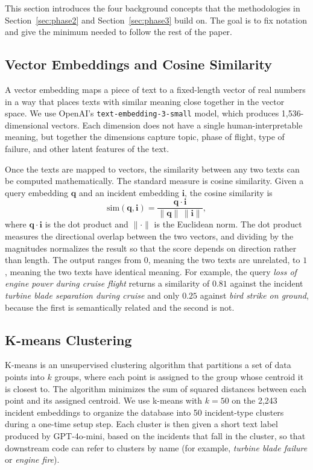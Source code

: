 \documentclass[11pt]{article}
\begin{document}
This section introduces the four background concepts that the methodologies in Section~\ref{sec:phase2} and Section~\ref{sec:phase3} build on. The goal is to fix notation and give the minimum needed to follow the rest of the paper.

\subsection{Vector Embeddings and Cosine Similarity}
\label{sec:background:embeddings}

A vector embedding maps a piece of text to a fixed-length vector of real numbers in a way that places texts with similar meaning close together in the vector space. We use OpenAI's \texttt{text-embedding-3-small} model, which produces 1{,}536-dimensional vectors. Each dimension does not have a single human-interpretable meaning, but together the dimensions capture topic, phase of flight, type of failure, and other latent features of the text.

Once the texts are mapped to vectors, the similarity between any two texts can be computed mathematically. The standard measure is cosine similarity. Given a query embedding $\mathbf{q}$ and an incident embedding $\mathbf{i}$, the cosine similarity is
\begin{equation}
\text{sim}(\mathbf{q}, \mathbf{i}) = \frac{\mathbf{q} \cdot \mathbf{i}}{\|\mathbf{q}\| \, \|\mathbf{i}\|},
\label{eq:cosine}
\end{equation}
where $\mathbf{q} \cdot \mathbf{i}$ is the dot product and $\|\cdot\|$ is the Euclidean norm. The dot product measures the directional overlap between the two vectors, and dividing by the magnitudes normalizes the result so that the score depends on direction rather than length. The output ranges from $0$, meaning the two texts are unrelated, to $1$, meaning the two texts have identical meaning. For example, the query \emph{loss of engine power during cruise flight} returns a similarity of $0.81$ against the incident \emph{turbine blade separation during cruise} and only $0.25$ against \emph{bird strike on ground}, because the first is semantically related and the second is not.

\subsection{K-means Clustering}
\label{sec:background:kmeans}

K-means is an unsupervised clustering algorithm that partitions a set of data points into $k$ groups, where each point is assigned to the group whose centroid it is closest to. The algorithm minimizes the sum of squared distances between each point and its assigned centroid. We use k-means with $k = 50$ on the 2{,}243 incident embeddings to organize the database into 50 incident-type clusters during a one-time setup step. Each cluster is then given a short text label produced by GPT-4o-mini, based on the incidents that fall in the cluster, so that downstream code can refer to clusters by name (for example, \emph{turbine blade failure} or \emph{engine fire}).
\end{document}
